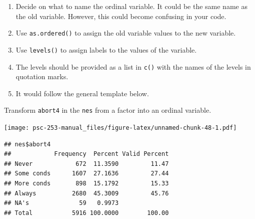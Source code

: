 \documentclass[
]{book}
\newenvironment{Shaded}{\begin{snugshade}}{\end{snugshade}}
\newcommand{\CommentTok}[1]{\textcolor[rgb]{0.56,0.35,0.01}{\textit{#1}}}
\newcommand{\FunctionTok}[1]{\textcolor[rgb]{0.00,0.00,0.00}{#1}}
\newcommand{\NormalTok}[1]{#1}
\newcommand{\OtherTok}[1]{\textcolor[rgb]{0.56,0.35,0.01}{#1}}
\newcommand{\SpecialCharTok}[1]{\textcolor[rgb]{0.00,0.00,0.00}{#1}}
\newcommand{\StringTok}[1]{\textcolor[rgb]{0.31,0.60,0.02}{#1}}
\providecommand{\tightlist}{%
  \setlength{\itemsep}{0pt}\setlength{\parskip}{0pt}}
\begin{document}
\begin{enumerate}
\def\labelenumi{\arabic{enumi}.}
\tightlist
\item
  Decide on what to name the ordinal variable. It could be the same name as the old variable. However, this could become confusing in your code.
\item
  Use \texttt{as.ordered()} to assign the old variable values to the new variable.
\item
  Use \texttt{levels()} to assign labels to the values of the variable.
\item
  The levels should be provided as a list in \texttt{c()} with the names of the levels in quotation marks.
\item
  It would follow the general template below.
\end{enumerate}

\begin{Shaded}
\end{Shaded}

Transform \texttt{abort4} in the \texttt{nes} from a factor into an ordinal variable.

\begin{Shaded}
\end{Shaded}

\texttt{[image: psc-253-manual\_files/figure-latex/unnamed-chunk-48-1.pdf]}

\begin{verbatim}
## nes$abort4 
##            Frequency  Percent Valid Percent
## Never            672  11.3590         11.47
## Some conds      1607  27.1636         27.44
## More conds       898  15.1792         15.33
## Always          2680  45.3009         45.76
## NA's              59   0.9973              
## Total           5916 100.0000        100.00
\end{verbatim}
\end{document}
